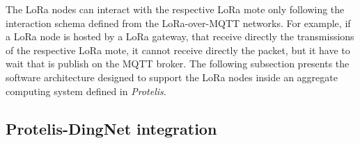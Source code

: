 The LoRa nodes can interact with the respective LoRa mote only following the interaction schema defined from the LoRa-over-MQTT networks. 
For example, if a LoRa node is hosted by a LoRa gateway, that receive directly the transmissions of the respective LoRa mote, it cannot receive directly the packet, but it have to wait that is publish on the MQTT broker.
The following subsection presents the software architecture designed to support the LoRa nodes inside an aggregate computing system defined in \textit{Protelis}.  

\subsection{Protelis-DingNet integration}

